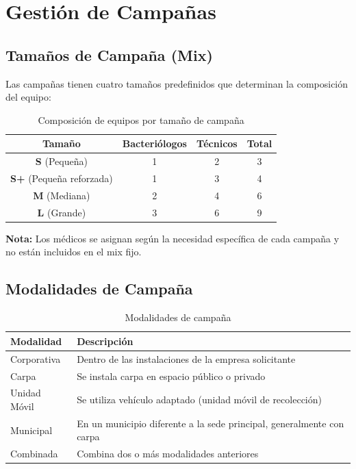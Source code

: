 \documentclass[9pt,a4paper]{extarticle}
\begin{document}
\section{Gesti\'{o}n de Campañas}

\subsection{Tamaños de Campaña (Mix)}

Las campañas tienen cuatro tamaños predefinidos que determinan la composici\'{o}n del equipo:

\begin{table}[h!]
\centering
\begin{tabular}{|c|c|c|c|}
\hline
\textbf{Tamaño} & \textbf{Bacteri\'{o}logos} & \textbf{T\'{e}cnicos} & \textbf{Total}\\
\hline
\textbf{S} (Pequeña) & 1 & 2 & 3\\
\hline
\textbf{S+} (Pequeña reforzada) & 1 & 3 & 4\\
\hline
\textbf{M} (Mediana) & 2 & 4 & 6\\
\hline
\textbf{L} (Grande) & 3 & 6 & 9\\
\hline
\end{tabular}
\caption{Composici\'{o}n de equipos por tamaño de campaña}
\end{table}

\textbf{Nota:} Los m\'{e}dicos se asignan seg\'{u}n la necesidad espec\'{i}fica de cada campaña y no est\'{a}n incluidos en el mix fijo.

\subsection{Modalidades de Campaña}

\begin{table}[h!]
\centering
\begin{tabularx}{\textwidth}{|l|X|}
\hline
\textbf{Modalidad} & \textbf{Descripci\'{o}n} \\
\hline
Corporativa & Dentro de las instalaciones de la empresa solicitante \\
\hline
Carpa & Se instala carpa en espacio p\'{u}blico o privado \\
\hline
Unidad M\'{o}vil & Se utiliza veh\'{i}culo adaptado (unidad m\'{o}vil de recolecci\'{o}n) \\
\hline
Municipal & En un municipio diferente a la sede principal, generalmente con carpa \\
\hline
Combinada & Combina dos o m\'{a}s modalidades anteriores \\
\hline
\end{tabularx}
\caption{Modalidades de campaña}
\end{table}
\end{document}
